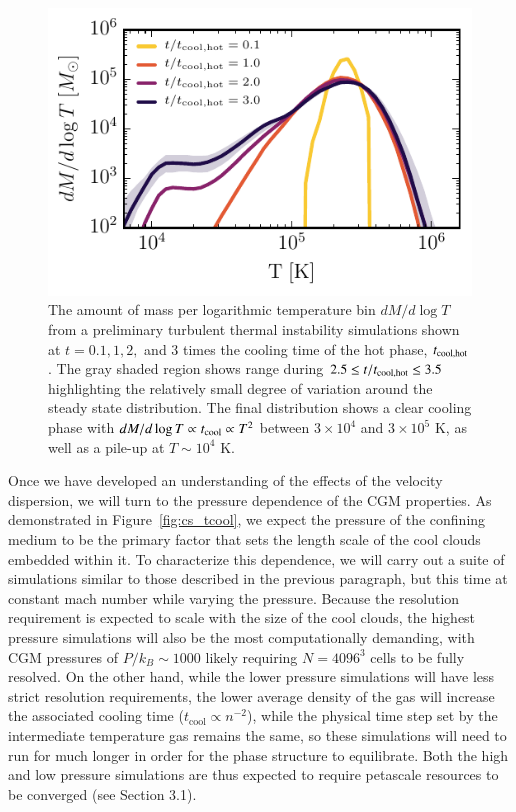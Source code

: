 \documentclass[11pt,letterpaper,english]{article}
\begin{document}
\begin{figure}[t]
    \centering
    \begin{minipage}{0.625\textwidth}
        \includegraphics[width=1.\textwidth]{dMdlogT_proposal_t.pdf} 
    \end{minipage}\hfill
    \begin{minipage}{0.375\textwidth}
	\caption{  The amount of mass per logarithmic temperature bin $dM / d\log T$ from a preliminary turbulent thermal instability simulations shown at $t = 0.1,1,2,$ and $3$ times the cooling time of the hot phase, $t_{\rm cool,hot}$. The gray shaded region shows range during $ 2.5 \leq t / t_{\rm cool,hot} \leq 3.5$ highlighting the relatively small degree of variation around the steady state distribution. The final distribution shows a clear cooling phase with $dM / d\log T \propto t_{\rm cool} \propto T^2$ between $3\times10^4$ and $3\times10^5$ K, as well as a pile-up at $T\sim10^4$ K. \label{fig:sim_phase}}
    \end{minipage}

\end{figure}

Once we have developed an understanding of the effects of the velocity dispersion, we will turn to the pressure dependence of the CGM properties. As demonstrated in Figure~\ref{fig:cs_tcool}, we expect the pressure of the confining medium to be the primary factor that sets the length scale of the cool clouds embedded within it. To characterize this dependence, we will carry out a suite of simulations similar to those described in the previous paragraph, but this time at constant mach number while varying the pressure. Because the resolution requirement is expected to scale with the size of the cool clouds, the highest pressure simulations will also be the most computationally demanding, with CGM pressures of $P/k_B \sim 1000$ likely requiring $N = 4096^3$ cells to be fully resolved. On the other hand, while the lower pressure simulations will have less strict resolution requirements, the lower average density of the gas will increase the associated cooling time ($t_\mathrm{cool} \propto n^{-2}$), while the physical time step set by the intermediate temperature gas remains the same, so these simulations will need to run for much longer in order for the phase structure to equilibrate. Both the high and low pressure simulations are thus expected to require petascale resources to be converged (see Section 3.1).
\end{document}
